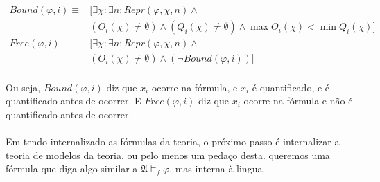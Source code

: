        \begin{align*}
            Bound(\varphi, i)\equiv&[\exists\chi:\exists n: Repr(\varphi,\chi,n)\land\\
                &(O_i(\chi) \not = \emptyset) \land (Q_i(\chi)\not = \emptyset) \land \max O_i(\chi) < \min Q_i(\chi)]\\
            Free(\varphi,  i)\equiv&[\exists\chi:\exists n: Repr(\varphi,\chi,n)\land\\
                &(O_i(\chi) \not = \emptyset) \land (\neg Bound(\varphi, i))]
        \end{align*}

        \paragraph{}
            Ou seja, $Bound(\varphi, i)$ diz que $x_i$ ocorre na fórmula, e $x_i$ é quantificado, 
            e é quantificado antes de ocorrer. E $Free(\varphi, i)$ diz que $x_i$ ocorre na fórmula 
            e não é quantificado antes de ocorrer.

        \paragraph{}
            Em tendo internalizado as fórmulas da teoria, o próximo passo é internalizar a teoria de modelos da teoria, ou pelo menos um pedaço desta.
            queremos uma fórmula que diga algo similar a $ \mathfrak A \vDash_f \varphi $, mas interna à lingua.